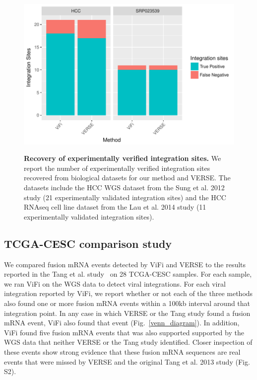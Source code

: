 \documentclass{bioinfo}
\begin{document}
\begin{figure}[htpb]
  \centering
  \includegraphics[width=1\linewidth]{results/hcc.pdf}\\
\caption[Recovery of experimentally verified integration sites from biological datasets.]
{\label{bio_results}  {\bf Recovery of experimentally verified integration sites.}  We report the number of experimentally verified integration sites recovered from biological datasets for our method and VERSE.  The datasets include the HCC WGS dataset from the Sung et al. 2012 study (21 experimentally validated integration sites) and the HCC RNAseq cell line dataset from the Lau et al. 2014 study (11 experimentally validated integration sites).}
\end{figure}


\subsection{TCGA-CESC comparison study}
We compared fusion mRNA events detected by ViFi and VERSE to the results reported in the Tang et al. study~\cite{Tang2013} on 28 TCGA-CESC samples.  For each sample, we ran ViFi on the WGS data to detect viral integrations.  For each viral integration reported by ViFi, we report whether or not each of the three methods also found one or more fusion mRNA events within a 100kb interval around that integration point.  In any case in which VERSE or the Tang study found a fusion mRNA event, ViFi also found that event (Fig.~\ref{venn_diagram}).  In addition, ViFi found five fusion mRNA events that was also supported supported by the WGS data that neither VERSE or the Tang study identified.  Closer inspection of these events show strong evidence that these fusion mRNA sequences are real events that were missed by VERSE and the original Tang et al. 2013 study (Fig. S2).
\end{document}
